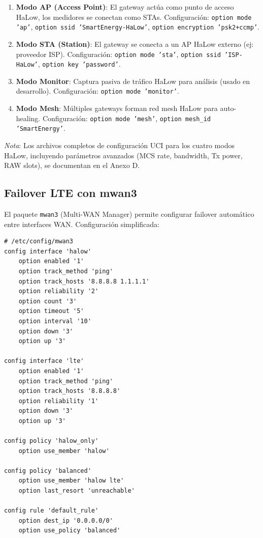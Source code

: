\begin{enumerate}
    \item \textbf{Modo AP (Access Point)}: El gateway actúa como punto de acceso HaLow, los medidores se conectan como STAs. Configuración: \texttt{option mode 'ap'}, \texttt{option ssid 'SmartEnergy-HaLow'}, \texttt{option encryption 'psk2+ccmp'}.
    
    \item \textbf{Modo STA (Station)}: El gateway se conecta a un AP HaLow externo (ej: proveedor ISP). Configuración: \texttt{option mode 'sta'}, \texttt{option ssid 'ISP-HaLow'}, \texttt{option key 'password'}.
    
    \item \textbf{Modo Monitor}: Captura pasiva de tráfico HaLow para análisis (usado en desarrollo). Configuración: \texttt{option mode 'monitor'}.
    
    \item \textbf{Modo Mesh}: Múltiples gateways forman red mesh HaLow para auto-healing. Configuración: \texttt{option mode 'mesh'}, \texttt{option mesh\_id 'SmartEnergy'}.
\end{enumerate}

\textit{Nota}: Los archivos completos de configuración UCI para los cuatro modos HaLow, incluyendo parámetros avanzados (MCS rate, bandwidth, Tx power, RAW slots), se documentan en el Anexo D.

\subsection{Failover LTE con mwan3}

El paquete \texttt{mwan3} (Multi-WAN Manager) permite configurar failover automático entre interfaces WAN. Configuración simplificada:

\begin{verbatim}
# /etc/config/mwan3
config interface 'halow'
    option enabled '1'
    option track_method 'ping'
    option track_hosts '8.8.8.8 1.1.1.1'
    option reliability '2'
    option count '3'
    option timeout '5'
    option interval '10'
    option down '3'
    option up '3'

config interface 'lte'
    option enabled '1'
    option track_method 'ping'
    option track_hosts '8.8.8.8'
    option reliability '1'
    option down '3'
    option up '3'

config policy 'halow_only'
    option use_member 'halow'

config policy 'balanced'
    option use_member 'halow lte'
    option last_resort 'unreachable'

config rule 'default_rule'
    option dest_ip '0.0.0.0/0'
    option use_policy 'balanced'
\end{verbatim}


